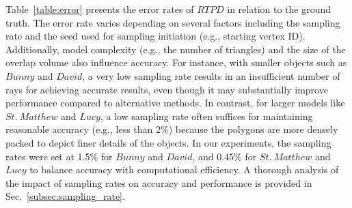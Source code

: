 
Table~\ref{table:error} presents the error rates of $RTPD$ in relation to the ground truth.
The error rate varies depending on several factors including the sampling rate and the seed used for sampling initiation (e.g., starting vertex ID).
Additionally, model complexity (e.g., the number of triangles) and the size of the overlap volume also influence accuracy.
For instance, with smaller objects such as $Bunny$ and $David$, a very low sampling rate results in an insufficient number of rays for achieving accurate results, even though it may substantially improve performance compared to alternative methods.
In contrast, for larger models like $St.~Matthew$ and $Lucy$, a low sampling rate often suffices for maintaining reasonable accuracy (e.g., less than 2\%) because the polygons are more densely packed to depict finer details of the objects.
In our experiments, the sampling rates were set at 1.5\% for $Bunny$ and $David$, and 0.45\% for $St.~Matthew$ and $Lucy$ to balance accuracy with computational efficiency.
A thorough analysis of the impact of sampling rates on accuracy and performance is provided in Sec.~\ref{subsec:sampling_rate}.



